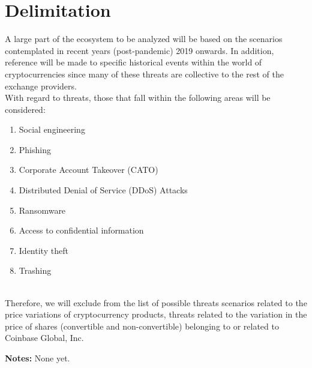 \documentclass[12pt,a4paper]{article}
\begin{document}
\section{Delimitation}
A large part of the ecosystem to be analyzed will be based on the scenarios contemplated in recent years (post-pandemic) 2019 onwards. In addition, reference will be made to specific historical events within the world of cryptocurrencies since many of these threats are collective to the rest of the exchange providers.\\
With regard to threats, those that fall within the following areas will be considered:
\begin{enumerate}
    \item Social engineering
    \item Phishing
    \item Corporate Account Takeover (CATO)
    \item Distributed Denial of Service (DDoS) Attacks
    \item Ransomware
    \item Access to confidential information
    \item Identity theft
    \item Trashing
\end{enumerate} \\
Therefore, we will exclude from the list of possible threats scenarios related to the price variations of cryptocurrency products, threats related to the variation in the price of shares (convertible and non-convertible) belonging to or related to Coinbase Global, Inc.
 \clearpage



\vspace{10mm}
\noindent \hrulefill

{\bf Notes:} 
None yet.
\end{document}
